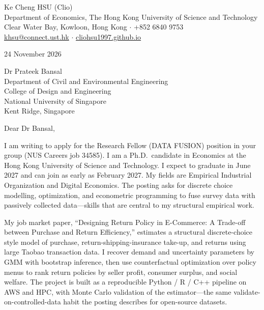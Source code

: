 \documentclass[11pt]{article}
\begin{document}
\begin{flushleft}
Ke Cheng HSU (Clio) \\
Department of Economics, The Hong Kong University of Science and Technology \\
Clear Water Bay, Kowloon, Hong Kong $\cdot$ +852 6840 9753 \\
\href{mailto:khsu@connect.ust.hk}{khsu@connect.ust.hk} $\cdot$ \href{https://cliohsu1997.github.io/}{cliohsu1997.github.io}
\end{flushleft}

24 November 2026

\vspace{0.1em}
Dr Prateek Bansal \\
Department of Civil and Environmental Engineering \\
College of Design and Engineering \\
National University of Singapore \\
Kent Ridge, Singapore

\vspace{0.1em}
Dear Dr Bansal,

I am writing to apply for the Research Fellow (DATA FUSION) position in your group (NUS Careers job 34585). I am a Ph.D.\ candidate in Economics at the Hong Kong University of Science and Technology. I expect to graduate in June 2027 and can join as early as February 2027. My fields are Empirical Industrial Organization and Digital Economics. The posting asks for discrete choice modelling, optimization, and econometric programming to fuse survey data with passively collected data---skills that are central to my structural empirical work.

My job market paper, ``Designing Return Policy in E-Commerce: A Trade-off between Purchase and Return Efficiency,'' estimates a structural discrete-choice style model of purchase, return-shipping-insurance take-up, and returns using large Taobao transaction data. I recover demand and uncertainty parameters by GMM with bootstrap inference, then use counterfactual optimization over policy menus to rank return policies by seller profit, consumer surplus, and social welfare. The project is built as a reproducible Python / R / C++ pipeline on AWS and HPC, with Monte Carlo validation of the estimator---the same validate-on-controlled-data habit the posting describes for open-source datasets.
\end{document}
